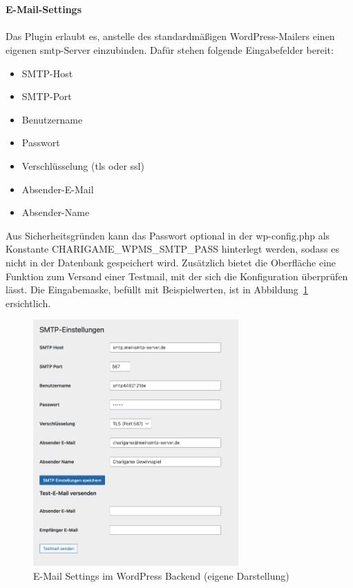 \\\\
\textbf{E-Mail-Settings}\\\\
Das Plugin erlaubt es, anstelle des standardmäßigen WordPress-Mailers einen eigenen \gls{smtp}-Server einzubinden.
Dafür stehen folgende Eingabefelder bereit:
\begin{itemize}
    \item SMTP-Host
    \item SMTP-Port
    \item Benutzername
    \item Passwort
    \item Verschlüsselung (\gls{tls} oder \gls{ssl})
    \item Absender-E-Mail
    \item Absender-Name
\end{itemize}
Aus Sicherheitsgründen kann das Passwort optional in der wp-config.php als Konstante \glqq CHARIGAME\_WPMS\_SMTP\_PASS\grqq{} hinterlegt werden, sodass es nicht in der Datenbank gespeichert wird.
Zusätzlich bietet die Oberfläche eine Funktion zum Versand einer Testmail, mit der sich die Konfiguration überprüfen lässt. Die Eingabemaske, befüllt mit Beispielwerten, ist in Abbildung~\ref{fig:email-backend-legacy} ersichtlich.
\begin{figure}[H]
    \centering
    \includegraphics[width=0.7\textwidth]{images/legacy_email_backend}
    \caption{E-Mail Settings im WordPress Backend (eigene Darstellung)}
    \label{fig:email-backend-legacy}
\end{figure}

